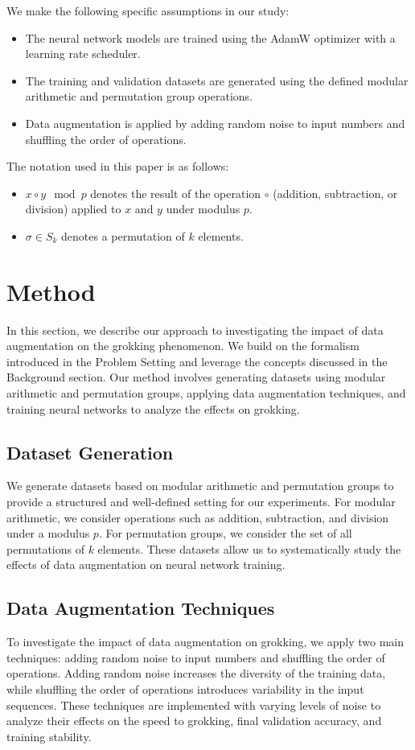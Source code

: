 \documentclass{article} %
\begin{document}
We make the following specific assumptions in our study:
\begin{itemize}
    \item The neural network models are trained using the AdamW optimizer \citep{loshchilov2017adamw} with a learning rate scheduler.
    \item The training and validation datasets are generated using the defined modular arithmetic and permutation group operations.
    \item Data augmentation is applied by adding random noise to input numbers and shuffling the order of operations.
\end{itemize}
The notation used in this paper is as follows:
\begin{itemize}
    \item \( x \circ y \mod p \) denotes the result of the operation \( \circ \) (addition, subtraction, or division) applied to \( x \) and \( y \) under modulus \( p \).
    \item \( \sigma \in S_k \) denotes a permutation of \( k \) elements.
\end{itemize}

\section{Method}
\label{sec:method}

In this section, we describe our approach to investigating the impact of data augmentation on the grokking phenomenon. We build on the formalism introduced in the Problem Setting and leverage the concepts discussed in the Background section. Our method involves generating datasets using modular arithmetic and permutation groups, applying data augmentation techniques, and training neural networks to analyze the effects on grokking.

\subsection{Dataset Generation}
We generate datasets based on modular arithmetic and permutation groups to provide a structured and well-defined setting for our experiments. For modular arithmetic, we consider operations such as addition, subtraction, and division under a modulus \( p \). For permutation groups, we consider the set of all permutations of \( k \) elements. These datasets allow us to systematically study the effects of data augmentation on neural network training.

\subsection{Data Augmentation Techniques}
To investigate the impact of data augmentation on grokking, we apply two main techniques: adding random noise to input numbers and shuffling the order of operations. Adding random noise increases the diversity of the training data, while shuffling the order of operations introduces variability in the input sequences. These techniques are implemented with varying levels of noise to analyze their effects on the speed to grokking, final validation accuracy, and training stability.
\end{document}
